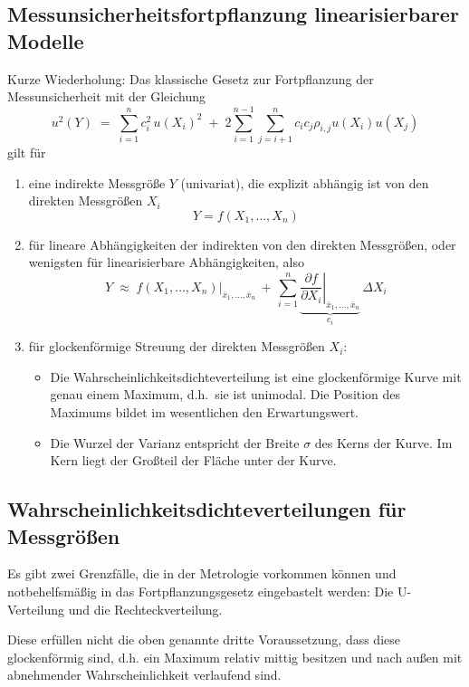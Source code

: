 \subsection{Messunsicherheitsfortpflanzung linearisierbarer Modelle}
Kurze Wiederholung:
Das klassische Gesetz zur Fortpflanzung der Messunsicherheit mit der Gleichung
\begin{equation}
u^2(Y) \; = \; \sum\limits_{i=1}^n c_i^2 \, u(X_i)^2 \; + \;
2 \sum\limits_{i = 1}^{n-1} \sum\limits_{j = i+1}^n c_i c_j \rho_{i, j} u(X_i) u(X_j)
\end{equation}
gilt für
\begin{enumerate}
	\item eine indirekte Messgröße $Y$ (univariat), die explizit abhängig ist von den direkten Messgrößen $X_i$
	\begin{equation}
	Y = f(X_1, \dots, X_n)
	\end{equation}
	\item für lineare Abhängigkeiten der indirekten von den direkten Messgrößen, oder wenigsten
	für linearisierbare Abhängigkeiten, also
	\begin{equation}
	Y \; \approx \; \left. f(X_1, \dots, X_n) \right|_{\bar x_1,\dots, \bar x_n} \, + \,
	\sum\limits_{i=1}^n \underbrace{\left. \frac{\partial f}{\partial X_i} \right|_{\bar x_1,\dots, \bar x_n}}_{c_i} \,
	\Delta X_i
	\end{equation}
	\item für glockenförmige Streuung der direkten Messgrößen $X_i$:
	\begin{itemize}
		\item Die Wahrscheinlichkeitsdichteverteilung
		ist eine glockenförmige Kurve mit genau einem Maximum, d.h.\ sie ist unimodal.
		Die Position des Maximums bildet im wesentlichen den Erwartungswert.
		\item Die Wurzel der Varianz entspricht der Breite $\sigma$ des Kerns der Kurve. Im Kern liegt
		der Großteil der Fläche unter der Kurve.
	\end{itemize}
\end{enumerate}
\subsection{Wahrscheinlichkeitsdichteverteilungen für Messgrößen}
Es gibt zwei Grenzfälle, die in der Metrologie vorkommen können und notbehelfsmäßig
in das Fort\-pflanzungs\-gesetz eingebastelt werden: Die U-Verteilung und die Rechteckverteilung.

Diese erfüllen nicht die oben genannte dritte Voraussetzung,
dass diese glockenförmig sind, d.h. ein Maximum relativ mittig besitzen und nach außen mit abnehmender Wahrscheinlichkeit verlaufend sind.

